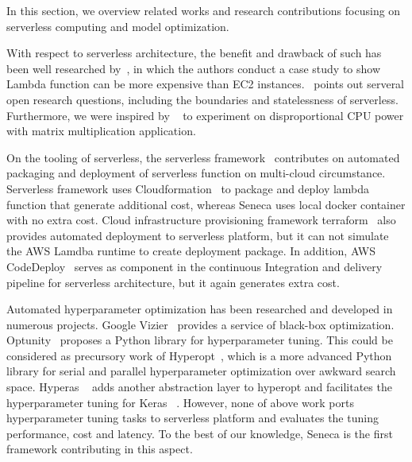 In this section, we overview related works and research contributions focusing on serverless computing and model optimization. 

With respect to serverless architecture, the benefit and drawback of such has been well researched by~\cite{ref:onesteptwostep}, in which the authors conduct a case study to show Lambda function can be more expensive than EC2 instances.~\cite{ref:baldini2017} points out serveral open research questions, including the boundaries and statelessness of serverless. Furthermore, we were inspired by ~\cite{ref:matrix} to experiment on disproportional CPU power with matrix multiplication application.  

On the tooling of serverless, the serverless framework~\cite{ref:serverless_framework} contributes on automated packaging and deployment of serverless function on multi-cloud circumstance. Serverless framework uses Cloudformation~\cite{ref:cloudformation} to package and deploy lambda function that generate additional cost, whereas Seneca uses local docker container with no extra cost. Cloud infrastructure provisioning framework terraform~\cite{ref:terraform} also provides automated deployment to serverless platform, but it can not simulate the AWS Lamdba runtime to create deployment package. In addition, AWS CodeDeploy~\cite{ref:codedeploy} serves as component in the continuous Integration and delivery pipeline for serverless architecture, but it again generates extra cost.

Automated hyperparameter optimization has been researched and developed in numerous projects. Google Vizier~\cite{ref:vizier} provides a service of black-box optimization. Optunity~\cite{ref:claesen2014hyperparameter} proposes a Python library for hyperparameter tuning. This could be considered as precursory work of Hyperopt~\cite{ref:hyperopt}, which is a more advanced Python library for serial and parallel hyperparameter optimization over awkward search space. Hyperas ~\cite{ref:hyperas} adds another abstraction layer to hyperopt and facilitates the hyperparameter tuning for Keras ~\cite{ref:keras}. However, none of above work ports hyperparameter tuning tasks to serverless platform and evaluates the tuning performance, cost and latency. To the best of our knowledge, Seneca is the first framework contributing in this aspect.